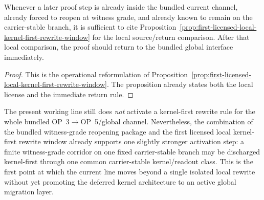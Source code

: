 \begin{corollary}
\label{cor:use-rule-for-the-first-local-kernel-first-rewrite-window}
Whenever a later proof step is already inside the bundled current channel, already forced to reopen at witness grade, and already known to remain on the carrier-stable branch, it is sufficient to cite Proposition~\ref{prop:first-licensed-local-kernel-first-rewrite-window} for the local source/return comparison. After that local comparison, the proof should return to the bundled global interface immediately.
\end{corollary}

\begin{proof}
This is the operational reformulation of Proposition~\ref{prop:first-licensed-local-kernel-first-rewrite-window}. The proposition already states both the local license and the immediate return rule.
\end{proof}


\begin{remark}
\label{rem:status-of-the-first-corridor-level-activation-step}
The present working line still does \emph{not} activate a kernel-first rewrite rule for the whole bundled OP~3$\to$OP~5/global channel. Nevertheless, the combination of the bundled witness-grade reopening package and the first licensed local kernel-first rewrite window already supports one slightly stronger activation step: a finite witness-grade corridor on one fixed carrier-stable branch may be discharged kernel-first through one common carrier-stable kernel/readout class. This is the first point at which the current line moves beyond a single isolated local rewrite without yet promoting the deferred kernel architecture to an active global migration layer.
\end{remark}

